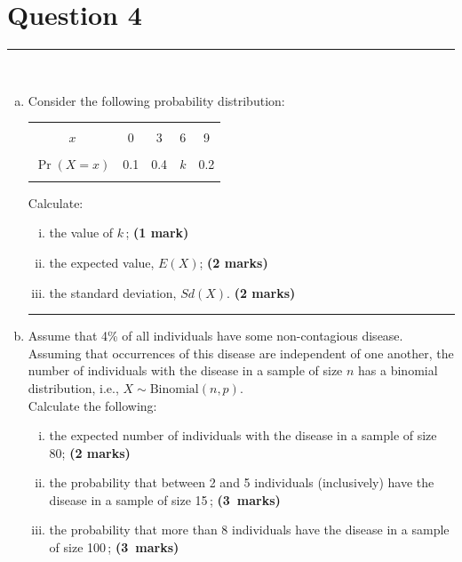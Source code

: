 \documentclass[12pt]{article}
\begin{document}
\section*{Question 4 }
\noindent\rule{\linewidth}{1pt}
\quad\\[-0.5cm]
\begin{enumerate}[a)]
\item Consider the following probability distribution:
\begin{center}
\begin{tabular}{|c|cccc|}
\hline
&&&&\\[-0.4cm]
$x$        & 0 & 3 & 6 & 9 \\
\hline
&&&&\\[-0.4cm]
$\Pr(X=x)$ & 0.1 & 0.4 & $k$ & 0.2 \\
\hline
\multicolumn{5}{c}{}
\end{tabular}
\end{center}
Calculate:
    \begin{enumerate}[i)]\itemsep0.2cm
    \item the value of $k$\,; \hfill{\scriptsize \bf (1 mark)}
    \item the expected value, $E(X)$; \hfill{\scriptsize \bf (2 marks)}
    \item the standard deviation, $Sd(X)$. \hfill{\scriptsize \bf (2 marks)}
    \end{enumerate}
\begin{center}\noindent\rule{0.4\linewidth}{0.5pt}\end{center}
\item Assume that 4\% of all individuals have some non-contagious disease. Assuming that occurrences of this disease are independent of one another, the number of individuals with the disease in a sample of size $n$ has a binomial distribution, i.e., $X \sim \text{Binomial}(n,p)$.\\[0.3cm]
    Calculate the following:
    \begin{enumerate}[i)]\itemsep0.3cm
    \item the expected number of individuals with the disease in a sample of size 80; \hfill{\scriptsize \bf (2 marks)}
    \item the probability that between 2 and 5 individuals (inclusively) have the disease in a sample of size 15\,; \hfill{\mbox{\scriptsize \bf (3 marks)}}
    \item the probability that more than 8 individuals have the disease in a sample of size 100\,; \hfill{\mbox{\scriptsize \bf (3 marks)}}

\end{enumerate}
\end{enumerate}
\end{document}
